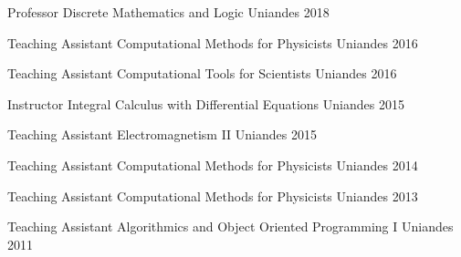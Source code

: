 


\begin{cvhonors}

    \cvhonor
    {Professor}
    {Discrete Mathematics and Logic}
    {Uniandes}
    {2018}

    \cvhonor
    {Teaching Assistant} %
    {Computational Methods for Physicists} %
    {Uniandes} %
    {2016} %

    \cvhonor
    {Teaching Assistant} %
    {Computational Tools for Scientists} %
    {Uniandes} %
    {2016} %

    \cvhonor
    {Instructor} %
    {Integral Calculus with Differential Equations} %
    {Uniandes} %
    {2015} %
    
    \cvhonor
    {Teaching Assistant} %
    {Electromagnetism II} %
    {Uniandes} %
    {2015} %
    
    \cvhonor
    {Teaching Assistant} %
    {Computational Methods for Physicists} %
    {Uniandes} %
    {2014} %

    \cvhonor
    {Teaching Assistant} %
    {Computational Methods for Physicists} %
    {Uniandes} %
    {2013} %

    \cvhonor
    {Teaching Assistant} %
    {Algorithmics and Object Oriented Programming I} %
    {Uniandes} %
    {2011} %

\end{cvhonors}
